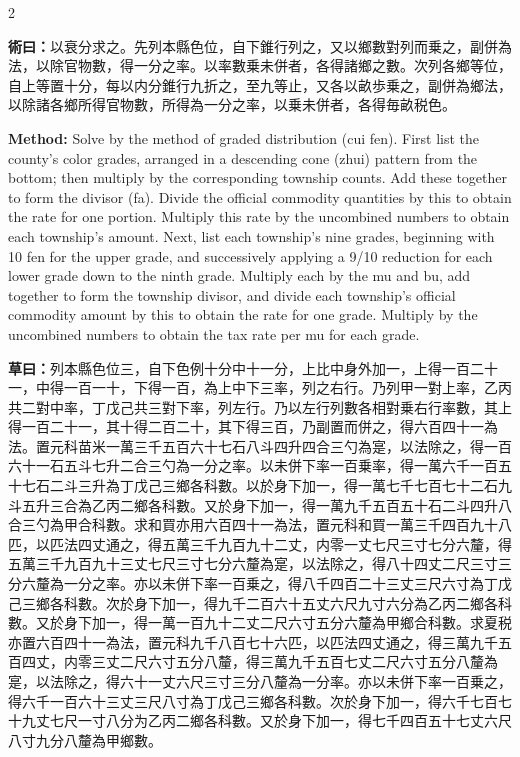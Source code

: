 \documentclass[11pt,a4paper]{article}
\newcommand{\MethodText}[1]{\par\noindent\textbf{\color{methodcolor}術曰：}#1\par}
\newcommand{\WorkingText}[1]{\par\noindent\textbf{草曰：}#1\par}
\newcommand{\MethodEn}[1]{\par\noindent\textbf{\color{methodcolor}Method:} #1\par}
\begin{document}
\begin{paracol}{2}
\switchcolumn*

\MethodText{以衰分求之。先列本縣色位，自下錐行列之，又以鄉數對列而乗之，副併為法，以除官物數，得一分之率。以率數乗未併者，各得諸鄉之數。次列各鄉等位，自上等置十分，每以内分錐行九折之，至九等止，又各以畝歩乗之，副併為鄉法，以除諸各鄉所得官物數，所得為一分之率，以乗未併者，各得毎畝税色。}

\switchcolumn

\MethodEn{Solve by the method of graded distribution (cui fen). First list the county's color grades, arranged in a descending cone (zhui) pattern from the bottom; then multiply by the corresponding township counts. Add these together to form the divisor (fa). Divide the official commodity quantities by this to obtain the rate for one portion. Multiply this rate by the uncombined numbers to obtain each township's amount. Next, list each township's nine grades, beginning with 10 fen for the upper grade, and successively applying a 9/10 reduction for each lower grade down to the ninth grade. Multiply each by the mu and bu, add together to form the township divisor, and divide each township's official commodity amount by this to obtain the rate for one grade. Multiply by the uncombined numbers to obtain the tax rate per mu for each grade.}

\switchcolumn*

\WorkingText{列本縣色位三，自下色例十分中十一分，上比中身外加一，上得一百二十一，中得一百一十，下得一百，為上中下三率，列之右行。乃列甲一對上率，乙丙共二對中率，丁戊己共三對下率，列左行。乃以左行列數各相對乗右行率數，其上得一百二十一，其十得二百二十，其下得三百，乃副置而併之，得六百四十一為法。置元科苗米一萬三千五百六十七石八斗四升四合三勺為寔，以法除之，得一百六十一石五斗七升二合三勺為一分之率。以未併下率一百乗率，得一萬六千一百五十七石二斗三升為丁戊己三鄉各科數。以於身下加一，得一萬七千七百七十二石九斗五升三合為乙丙二鄉各科數。又於身下加一，得一萬九千五百五十石二斗四升八合三勺為甲合科數。求和買亦用六百四十一為法，置元科和買一萬三千四百九十八匹，以匹法四丈通之，得五萬三千九百九十二丈，内零一丈七尺三寸七分六釐，得五萬三千九百九十三丈七尺三寸七分六釐為寔，以法除之，得八十四丈二尺三寸三分六釐為一分之率。亦以未併下率一百乗之，得八千四百二十三丈三尺六寸為丁戊己三鄉各科數。次於身下加一，得九千二百六十五丈六尺九寸六分為乙丙二鄉各科數。又於身下加一，得一萬一百九十二丈二尺六寸五分六釐為甲鄉合科數。求夏税亦置六百四十一為法，置元科九千八百七十六匹，以匹法四丈通之，得三萬九千五百四丈，内零三丈二尺六寸五分八釐，得三萬九千五百七丈二尺六寸五分八釐為寔，以法除之，得六十一丈六尺三寸三分八釐為一分率。亦以未併下率一百乗之，得六千一百六十三丈三尺八寸為丁戊己三鄉各科數。次於身下加一，得六千七百七十九丈七尺一寸八分为乙丙二鄉各科數。又於身下加一，得七千四百五十七丈六尺八寸九分八釐為甲鄉數。}


\end{paracol}
\end{document}
